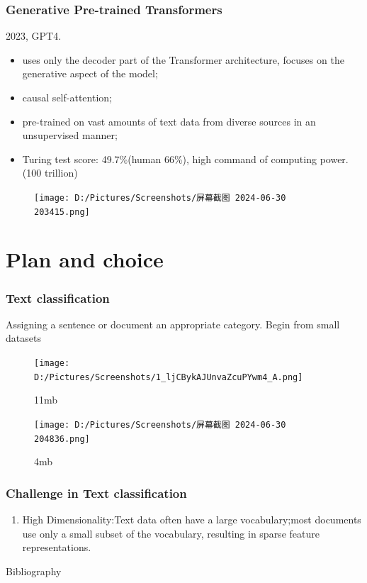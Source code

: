 \documentclass{beamer}
\begin{document}
\begin{frame}
  \frametitle{Generative Pre-trained Transformers}
  2023, GPT4\cite{openai2024gpt4technicalreport}.
  \begin{itemize}
    \item uses only the decoder part of the Transformer architecture, focuses on the generative aspect of the model;
    \item causal self-attention;
    \item pre-trained on vast amounts of text data from diverse sources in an unsupervised
    manner;
    \item Turing test score: 49.7\%(human 66\%), high command of computing power.(100 trillion)
  \end{itemize}
  \begin{figure}[H]
    \centering
    \texttt{[image: D:/Pictures/Screenshots/屏幕截图 2024-06-30 203415.png]}
  \end{figure}
\end{frame}
\section{Plan and choice}
\begin{frame}
  \frametitle{Text classification}
  Assigning a sentence or document an appropriate category.
  Begin from small datasets
  \begin{figure}[H]
    \centering
    \texttt{[image: D:/Pictures/Screenshots/1\_ljCBykAJUnvaZcuPYwm4\_A.png]}
    \caption{11mb}
  \end{figure}
  \begin{figure}[H]
    \centering
    \texttt{[image: D:/Pictures/Screenshots/屏幕截图 2024-06-30 204836.png]}
    \caption{4mb}
  \end{figure}
\end{frame}
\begin{frame}
  \frametitle{Challenge in Text classification}
  \begin{enumerate}
    \item High Dimensionality:Text data often have a large vocabulary;most documents use only a small subset of the vocabulary, resulting in sparse feature representations.
  \end{enumerate}
  
\end{frame}
\begin{frame}[allowframebreaks]{Bibliography}
  
\end{frame}
\end{document}
